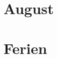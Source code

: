 \documentclass[../main.tex]{subfiles}
\begin{document}
	\section{August}
	
	\section{Ferien}
	
	
\end{document}
